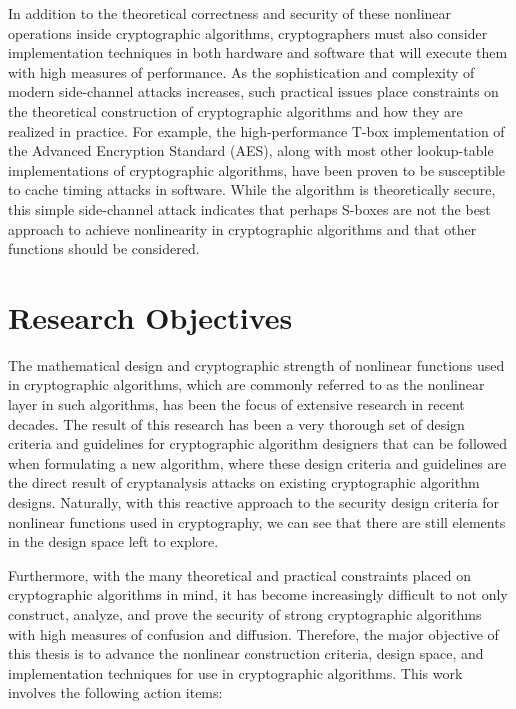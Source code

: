 \documentclass[10pt]{article}
\begin{document}
In addition to the theoretical correctness and security of these nonlinear operations inside cryptographic algorithms, cryptographers must also consider implementation techniques in both hardware and software that will execute them with high measures of performance. As the sophistication and complexity of modern side-channel attacks increases, such practical issues place constraints on the theoretical construction of cryptographic algorithms and how they are realized in practice. For example, the high-performance T-box implementation of the Advanced Encryption Standard (AES), along with most other lookup-table implementations of cryptographic algorithms, have been proven to be susceptible to cache timing attacks in software. While the algorithm is theoretically secure, this simple side-channel attack indicates that perhaps S-boxes are not the best approach to achieve nonlinearity in cryptographic algorithms and that other functions should be considered. 

\section{Research Objectives}
The mathematical design and cryptographic strength of nonlinear functions used in cryptographic algorithms, which are commonly referred to as the nonlinear layer in such algorithms, has been the focus of extensive research in recent decades. The result of this research has been a very thorough set of design criteria and guidelines for cryptographic algorithm designers that can be followed when formulating a new algorithm, where these design criteria and guidelines are the direct result of cryptanalysis attacks on existing cryptographic algorithm designs. Naturally, with this reactive approach to the security design criteria for nonlinear functions used in cryptography, we can see that there are still elements in the design space left to explore. 

Furthermore, with the many theoretical and practical constraints placed on cryptographic algorithms in mind, it has become increasingly difficult to not only construct, analyze, and prove the security of strong cryptographic algorithms with high measures of confusion and diffusion. Therefore, the major objective of this thesis is to advance the nonlinear construction criteria, design space, and implementation techniques for use in cryptographic algorithms. This work involves the following action items:
\end{document}
